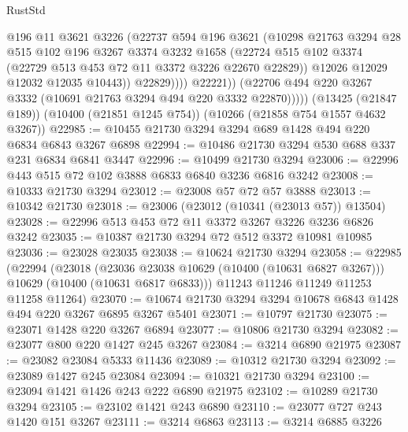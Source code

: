 \begin{lexlean}{RustStd}
\begin{coremodule}
                      @196
                      @11
                      @3621
                      @3226
                      (@22737
                        @594
                        @196
                        @3621
                        (@10298
                          @21763
                          @3294
                          @28
                          @515
                          @102
                          @196
                          @3267
                          @3374
                          @3232
                          @1658
                          (@22724
                            @515
                            @102
                            @3374
                            (@22729 @513 @453 @72 @11 @3372 @3226 @22670 @22829))
                          @12026
                          @12029
                          @12032
                          @12035
                          @10443))
                      @22829))))
              @22221))
          (@22706 @494 @220 @3267 @3332 (@10691 @21763 @3294 @494 @220 @3332 @22870)))))
    (@13425 (@21847 @189))
    (@10400 (@21851 @1245 @754))
    (@10266 (@21858 @754 @1557 @4632 @3267))
@22985 := @10455 @21730 @3294 @3294 @689 @1428 @494 @220 @6834 @6843 @3267 @6898
@22994 := @10486 @21730 @3294 @530 @688 @337 @231 @6834 @6841 @3447
@22996 := @10499 @21730 @3294
@23006 := @22996 @443 @515 @72 @102 @3888 @6833 @6840 @3236 @6816 @3242
@23008 := @10333 @21730 @3294
@23012 := @23008 @57 @72 @57 @3888
@23013 := @10342 @21730
@23018 := @23006 (@23012 (@10341 (@23013 @57)) @13504)
@23028 := @22996 @513 @453 @72 @11 @3372 @3267 @3226 @3236 @6826 @3242
@23035 := @10387 @21730 @3294 @72 @512 @3372 @10981 @10985
@23036 := @23028 @23035
@23038 := @10624 @21730 @3294
@23058 := @22985
    (@22994
      (@23018
        (@23036 @23038 @10629 (@10400 (@10631 @6827 @3267)))
        @10629
        (@10400 (@10631 @6817 @6833)))
      @11243
      @11246
      @11249
      @11253
      @11258
      @11264)
@23070 := @10674 @21730 @3294 @3294 @10678 @6843 @1428 @494 @220 @3267 @6895 @3267 @5401
@23071 := @10797 @21730
@23075 := @23071 @1428 @220 @3267 @6894
@23077 := @10806 @21730 @3294
@23082 := @23077 @800 @220 @1427 @245 @3267
@23084 := @3214 @6890 @21975
@23087 := @23082 @23084 @5333 @11436
@23089 := @10312 @21730 @3294
@23092 := @23089 @1427 @245 @23084
@23094 := @10321 @21730 @3294
@23100 := @23094 @1421 @1426 @243 @222 @6890 @21975
@23102 := @10289 @21730 @3294
@23105 := @23102 @1421 @243 @6890
@23110 := @23077 @727 @243 @1420 @151 @3267
@23111 := @3214 @6863
@23113 := @3214 @6885 @3226

\end{coremodule}
\end{lexlean}
